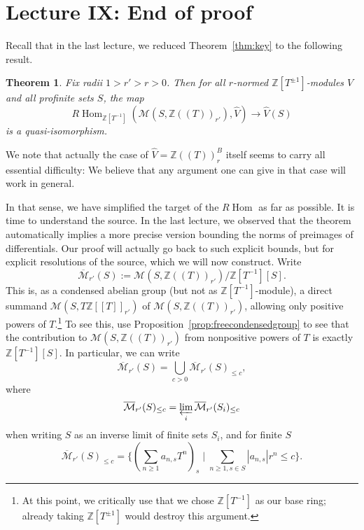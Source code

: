 \documentclass[11pt]{amsbook}
\DeclareMathOperator{\Hom}{Hom}
\numberwithin{equation}{section}
\newtheorem{theorem}{Theorem}
\numberwithin{theorem}{section}
\theoremstyle{definition}
\begin{document}
\newpage

\section{Lecture IX: End of proof}

Recall that in the last lecture, we reduced Theorem~\ref{thm:key} to the following result.

\begin{theorem}\label{thm:explicit1} Fix radii $1>r'>r>0$. Then for all $r$-normed $\mathbb Z[T^{\pm 1}]$-modules $V$ and all profinite sets $S$, the map
\[
R\Hom_{\mathbb Z[T^{-1}]}(\mathcal M(S,\mathbb Z((T))_{r'}),\widehat{V})\to \widehat{V}(S)
\]
is a quasi-isomorphism.
\end{theorem}

We note that actually the case of $\widehat{V}=\mathbb Z((T))_r^B$ itself seems to carry all essential difficulty: We believe that any argument one can give in that case will work in general.

In that sense, we have simplified the target of the $R\Hom$ as far as possible. It is time to understand the source. In the last lecture, we observed that the theorem automatically implies a more precise version bounding the norms of preimages of differentials. Our proof will actually go back to such explicit bounds, but for explicit resolutions of the source, which we will now construct. Write
\[
\overline{\mathcal M}_{r'}(S) := \mathcal M(S,\mathbb Z((T))_{r'})/\mathbb Z[T^{-1}][S].
\]
This is, as a condensed abelian group (but not as $\mathbb Z[T^{-1}]$-module), a direct summand $\mathcal M(S,T\mathbb Z[[T]]_{r'})$ of $\mathcal M(S,\mathbb Z((T))_{r'})$, allowing only positive powers of $T$.\footnote{At this point, we critically use that we chose $\mathbb Z[T^{-1}]$ as our base ring; already taking $\mathbb Z[T^{\pm 1}]$ would destroy this argument.} To see this, use Proposition~\ref{prop:freecondensedgroup} to see that the contribution to $\mathcal M(S,\mathbb Z((T))_{r'})$ from nonpositive powers of $T$ is exactly $\mathbb Z[T^{-1}][S]$. In particular, we can write
\[
\overline{\mathcal M}_{r'}(S) = \bigcup_{c>0} \overline{\mathcal M}_{r'}(S)_{\leq c},
\]
where
\[
\overline{\mathcal M}_{r'}(S)_{\leq c} = \varprojlim_i \overline{\mathcal M}_{r'}(S_i)_{\leq c}
\]
when writing $S$ as an inverse limit of finite sets $S_i$, and for finite $S$
\[
\overline{\mathcal M}_{r'}(S)_{\leq c} = \{(\sum_{n\geq 1} a_{n,s} T^n)_s\mid \sum_{n\geq 1,s\in S} |a_{n,s}|r^n\leq c\}.
\]
\end{document}
